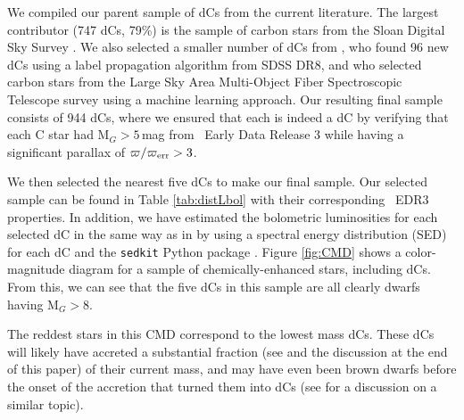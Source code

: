 \documentclass[twocolumn, tighten, times, astrosymb]{aastex631}
\begin{document}
We compiled our parent sample of dCs from the current literature. The largest contributor (747 dCs, 79\%) is the \citet{Green2013} sample of carbon stars from the Sloan Digital Sky Survey \citep[SDSS;][]{SDSS_1-2}. We also selected a smaller number of dCs from \citet{Si2014}, who found 96 new dCs using a label propagation algorithm from SDSS DR8, and \citet{Li2018} who selected carbon stars from the Large Sky Area Multi-Object Fiber Spectroscopic Telescope survey \citep[LAMOST;][]{LAMOST} using a machine learning approach. Our resulting final  sample consists of 944 dCs, where we ensured that each is indeed a dC by verifying that each C star had M$_G > 5$\,mag from \Gaia\ Early Data Release 3 \citep[\Gaia\ EDR3;][]{GaiaEDR3} while having a significant parallax of $\varpi / \varpi_{\rm{err}} > 3$.  

We then selected the nearest five dCs to make our final \added{\Chandra} sample. Our selected sample can be found in Table \ref{tab:distLbol} with their corresponding  \Gaia\ EDR3 properties. In addition, we have estimated the bolometric luminosities for each selected dC in the same way as in \citet{Green2019} by using a spectral energy distribution (SED) for each dC and the \texttt{sedkit} Python package \citep{Filippazzo2015}. Figure \ref{fig:CMD} shows a color-magnitude diagram for a sample of chemically-enhanced stars, including dCs. From this, we can see that the five dCs in this sample are all clearly dwarfs having M$_G > 8$. 

The reddest stars in this CMD correspond to the lowest mass dCs. These dCs will likely have accreted a substantial fraction (see \citet{Miszalski2013} and the discussion at the end of this paper) of their current mass, and may have even been brown dwarfs before the onset of the accretion that turned them into dCs (see \citet{Majidi2021} for a discussion on a similar topic).


\end{document}

